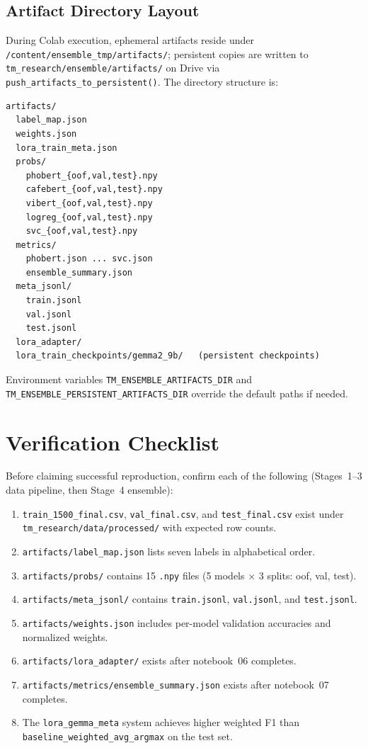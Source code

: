 \documentclass[11pt,a4paper]{article}
\newcommand{\repo}[1]{\texttt{#1}}
\begin{document}
\subsection{Artifact Directory Layout}
During Colab execution, ephemeral artifacts reside under \repo{/content/ensemble\_tmp/artifacts/}; persistent copies are written to \repo{tm\_research/ensemble/artifacts/} on Drive via \repo{push\_artifacts\_to\_persistent()}. The directory structure is:
\begin{lstlisting}
artifacts/
  label_map.json
  weights.json
  lora_train_meta.json
  probs/
    phobert_{oof,val,test}.npy
    cafebert_{oof,val,test}.npy
    vibert_{oof,val,test}.npy
    logreg_{oof,val,test}.npy
    svc_{oof,val,test}.npy
  metrics/
    phobert.json ... svc.json
    ensemble_summary.json
  meta_jsonl/
    train.jsonl
    val.jsonl
    test.jsonl
  lora_adapter/
  lora_train_checkpoints/gemma2_9b/   (persistent checkpoints)
\end{lstlisting}
Environment variables \texttt{TM\_ENSEMBLE\_ARTIFACTS\_DIR} and \texttt{TM\_ENSEMBLE\_PERSISTENT\_ARTIFACTS\_DIR} override the default paths if needed.

\section{Verification Checklist}
\label{sec:verification}

Before claiming successful reproduction, confirm each of the following (Stages~1--3 data pipeline, then Stage~4 ensemble):
\begin{enumerate}[label=\arabic*.]
  \item \repo{train\_1500\_final.csv}, \repo{val\_final.csv}, and \repo{test\_final.csv} exist under \repo{tm\_research/data/processed/} with expected row counts.
  \item \repo{artifacts/label\_map.json} lists seven labels in alphabetical order.
  \item \repo{artifacts/probs/} contains 15 \texttt{.npy} files (5 models $\times$ 3 splits: oof, val, test).
  \item \repo{artifacts/meta\_jsonl/} contains \repo{train.jsonl}, \repo{val.jsonl}, and \repo{test.jsonl}.
  \item \repo{artifacts/weights.json} includes per-model validation accuracies and normalized weights.
  \item \repo{artifacts/lora\_adapter/} exists after notebook~06 completes.
  \item \repo{artifacts/metrics/ensemble\_summary.json} exists after notebook~07 completes.
  \item The \texttt{lora\_gemma\_meta} system achieves higher weighted F1 than \texttt{baseline\_weighted\_avg\_argmax} on the test set.
\end{enumerate}
\end{document}
